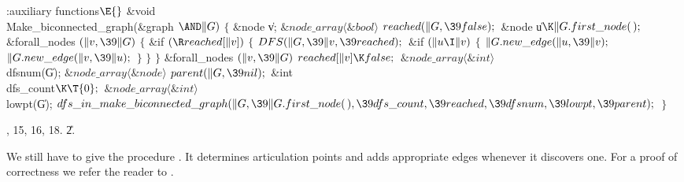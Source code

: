 \Y\B\4:auxiliary functions\X${}\E{}$\6
\&{void} \\{Make\_biconnected\_graph}(\&{graph} ${}{\AND}\|G){}$\1\1\2\2\6
${}\{{}$\1\6
\&{node} \|v;\6
${}\&{node\_array}\langle\&{bool}\rangle{}$ ${}\\{reached}(\|G,\39%
\\{false});{}$\6
\&{node} \|u${}\K\|G.\\{first\_node}(\,);{}$\7
\&{forall\_nodes} ${}(\|v,\39\|G){}$\5
${}\{{}$\1\6
\&{if} ${}(\R\\{reached}[\|v]){}$\5
${}\{{}$\1\6
${}\\{DFS}(\|G,\39\|v,\39\\{reached});{}$\6
\&{if} ${}(\|u\I\|v){}$\5
${}\{{}$\1\6
${}\|G.\\{new\_edge}(\|u,\39\|v);{}$\6
${}\|G.\\{new\_edge}(\|v,\39\|u);{}$\6
\4${}\}{}$\2\6
\4${}\}{}$\2\6
\4${}\}{}$\2\6
\&{forall\_nodes} ${}(\|v,\39\|G){}$\1\5
${}\\{reached}[\|v]\K\\{false};{}$\2\7
${}\&{node\_array}\langle\&{int}\rangle{}$ \\{dfsnum}(\|G);\6
${}\&{node\_array}\langle\&{node}\rangle{}$ ${}\\{parent}(\|G,\39\\{nil});{}$\6
\&{int} \\{dfs\_count}${}\K\T{0};{}$\6
${}\&{node\_array}\langle\&{int}\rangle{}$ \\{lowpt}(\|G);\7
${}\\{dfs\_in\_make\_biconnected\_graph}(\|G,\39\|G.\\{first\_node}(\,),\39%
\\{dfs\_count},\39\\{reached},\39\\{dfsnum},\39\\{lowpt},\39\\{parent});{}$\6
\4${}\}{}$\2\par
{}, 15, 16, 18.
\U2.\fi

We still have to give the procedure . It determines
articulation points and adds appropriate edges whenever it discovers one.
For a proof of correctness we refer the reader to
\cite[section IV.6]{Me:book}.

